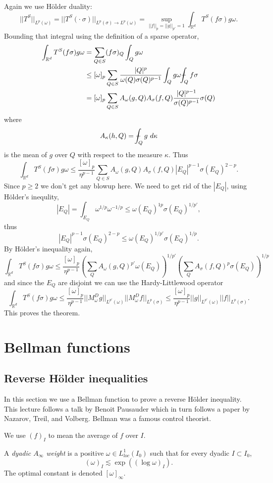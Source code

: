 \documentclass[12pt]{book}
\newcommand{\RR}{\mathbb{R}}
\def\Xint#1{\mathchoice
{\XXint\displaystyle\textstyle{#1}}%
{\XXint\textstyle\scriptstyle{#1}}%
{\XXint\scriptstyle\scriptscriptstyle{#1}}%
{\XXint\scriptscriptstyle\scriptscriptstyle{#1}}%
\!\int}
\def\XXint#1#2#3{{\setbox0=\hbox{$#1{#2#3}{\int}$ }
\vcenter{\hbox{$#2#3$ }}\kern-.6\wd0}}
\def\dashint{\Xint-}
\newcommand{\dfn}[1]{\emph{#1}\index{#1}}
\theoremstyle{definition}
\newenvironment{definition}
  {\pushQED{\qed}\renewcommand{\qedsymbol}{$\diamondsuit$}\definitionx}
  {\popQED\endexamplex}
\begin{document}
Again we use H\"older duality:
$$||T^S||_{L^p(\omega)} = ||T^S(\cdot ~\sigma)||_{L^p(\sigma) \to L^p(\omega)} =  \sup_{||f||_p = ||g||_{p'} = 1} \int_{\RR^d} T^S(f \sigma) g\omega.$$
Bounding that integral using the definition of a sparse operator,
\begin{align*}\int_{\RR^d} T^S(f \sigma) g\omega &= \sum_{Q \in S} (f\sigma)_Q \int_Q g\omega \\
&\leq [\omega]_p \sum_{Q \in S} \frac{|Q|^p}{\omega(Q)\sigma(Q)^{p-1}} \int_Q g\omega \dashint_Q f\sigma\\
&= [\omega]_p \sum_{Q \in S} A_\omega(g, Q) A_\sigma(f, Q) \frac{|Q|^{p-1}}{\sigma(Q)^{p-1}} \sigma(Q)
\end{align*}
where
$$A_\kappa(h, Q) = \dashint_Q g~d\kappa$$
is the mean of $g$ over $Q$ with respect to the measure $\kappa$.
Thus
$$\int_{\RR^d} T^S(f \sigma) g\omega \leq \frac{[\omega]_p}{\eta^{p-1}} \sum_{Q \in S} A_\omega(g, Q) A_\sigma(f, Q) |E_Q|^{p-1} \sigma(E_Q)^{2-p}.$$
Since $p \geq 2$ we don't get any blowup here.
We need to get rid of the $|E_Q|$, using H\"older's inequlity,
$$|E_Q| = \int_{E_Q} \omega^{1/p} \omega^{-1/p} \leq \omega(E_Q)^{1p} \sigma(E_Q)^{1/p'},$$
thus
$$|E_Q|^{p-1} \sigma(E_Q)^{2-p} \leq \omega(E_Q)^{1/p'} \sigma(E_Q)^{1/p}.$$
By H\"older's inequality again,
$$\int_{\RR^d} T^S(f\sigma) g\omega \leq \frac{[\omega]_p}{\eta^{p-1}} (\sum_Q A_\omega(g, Q)^{p'} \omega(E_Q))^{1/p'} (\sum_Q A_\sigma(f, Q)^p \sigma(E_Q))^{1/p}$$
and since the $E_Q$ are disjoint we can use the Hardy-Littlewood operator
$$\int_{\RR^d} T^S(f\sigma) g\omega \leq \frac{[\omega]_p}{\eta^{p-1}} ||M^D_\omega g||_{L^{p'}(\omega)} ||M^D_\omega f||_{L^p(\sigma)} \leq \frac{[\omega]_p}{\eta^{p-1}} ||g||_{L^{p'}(\omega)} ||f||_{L^p(\sigma)}.$$
This proves the theorem.

\chapter{Bellman functions}
\section{Reverse H\"older inequalities}
In this section we use a Bellman function to prove a reverse H\"older inequality.
This lecture follows a talk by Benoit Pausauder which in turn follows a paper by Nazarov, Treil, and Volberg.
Bellman was a famous control theorist.

We use $(f)_I$ to mean the average of $f$ over $I$.

\begin{definition}
A \dfn{dyadic $A_\infty$ weight} is a positive $\omega \in L^1_{loc}(I_0)$ such that for every dyadic $I \subset I_0$,
$$(\omega)_I \lesssim \exp((\log \omega)_I).$$
The optimal constant is denoted $[\omega]_\infty$.
\end{definition}
\end{document}
